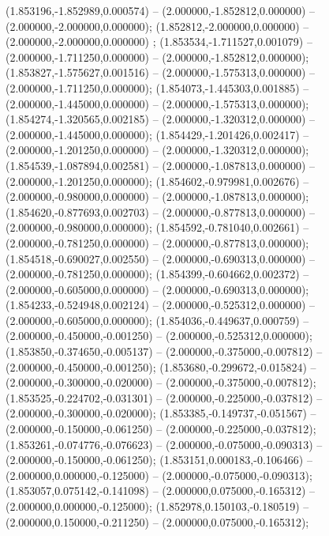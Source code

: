  (1.853196,-1.852989,0.000574) -- (2.000000,-1.852812,0.000000) -- (2.000000,-2.000000,0.000000);
 (1.852812,-2.000000,0.000000) -- (2.000000,-2.000000,0.000000) ;
 (1.853534,-1.711527,0.001079) -- (2.000000,-1.711250,0.000000) -- (2.000000,-1.852812,0.000000);
 (1.853827,-1.575627,0.001516) -- (2.000000,-1.575313,0.000000) -- (2.000000,-1.711250,0.000000);
 (1.854073,-1.445303,0.001885) -- (2.000000,-1.445000,0.000000) -- (2.000000,-1.575313,0.000000);
 (1.854274,-1.320565,0.002185) -- (2.000000,-1.320312,0.000000) -- (2.000000,-1.445000,0.000000);
 (1.854429,-1.201426,0.002417) -- (2.000000,-1.201250,0.000000) -- (2.000000,-1.320312,0.000000);
 (1.854539,-1.087894,0.002581) -- (2.000000,-1.087813,0.000000) -- (2.000000,-1.201250,0.000000);
 (1.854602,-0.979981,0.002676) -- (2.000000,-0.980000,0.000000) -- (2.000000,-1.087813,0.000000);
 (1.854620,-0.877693,0.002703) -- (2.000000,-0.877813,0.000000) -- (2.000000,-0.980000,0.000000);
 (1.854592,-0.781040,0.002661) -- (2.000000,-0.781250,0.000000) -- (2.000000,-0.877813,0.000000);
 (1.854518,-0.690027,0.002550) -- (2.000000,-0.690313,0.000000) -- (2.000000,-0.781250,0.000000);
 (1.854399,-0.604662,0.002372) -- (2.000000,-0.605000,0.000000) -- (2.000000,-0.690313,0.000000);
 (1.854233,-0.524948,0.002124) -- (2.000000,-0.525312,0.000000) -- (2.000000,-0.605000,0.000000);
 (1.854036,-0.449637,0.000759) -- (2.000000,-0.450000,-0.001250) -- (2.000000,-0.525312,0.000000);
 (1.853850,-0.374650,-0.005137) -- (2.000000,-0.375000,-0.007812) -- (2.000000,-0.450000,-0.001250);
 (1.853680,-0.299672,-0.015824) -- (2.000000,-0.300000,-0.020000) -- (2.000000,-0.375000,-0.007812);
 (1.853525,-0.224702,-0.031301) -- (2.000000,-0.225000,-0.037812) -- (2.000000,-0.300000,-0.020000);
 (1.853385,-0.149737,-0.051567) -- (2.000000,-0.150000,-0.061250) -- (2.000000,-0.225000,-0.037812);
 (1.853261,-0.074776,-0.076623) -- (2.000000,-0.075000,-0.090313) -- (2.000000,-0.150000,-0.061250);
 (1.853151,0.000183,-0.106466) -- (2.000000,0.000000,-0.125000) -- (2.000000,-0.075000,-0.090313);
 (1.853057,0.075142,-0.141098) -- (2.000000,0.075000,-0.165312) -- (2.000000,0.000000,-0.125000);
 (1.852978,0.150103,-0.180519) -- (2.000000,0.150000,-0.211250) -- (2.000000,0.075000,-0.165312);
